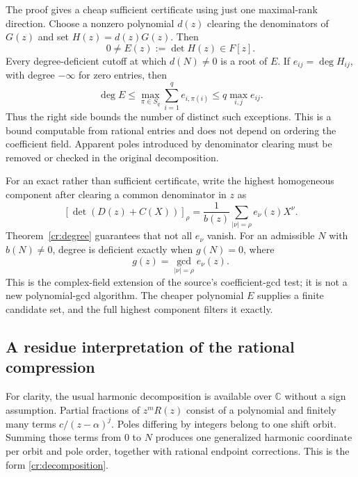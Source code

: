 \documentclass[11pt,a4paper]{article}
\theoremstyle{definition}
\theoremstyle{remark}
\numberwithin{equation}{section}
\begin{document}
The proof gives a cheap sufficient certificate using just one
maximal-rank direction.  Choose a nonzero polynomial $d(z)$ clearing
the denominators of $G(z)$ and set $H(z)=d(z)G(z)$.  Then
\begin{equation}\label{cr:certificate}
 0\ne E(z):=\det H(z)\in F[z].
\end{equation}
Every degree-deficient cutoff at which $d(N)\ne0$ is a root of
$E$.  If $e_{ij}=\deg H_{ij}$, with degree $-\infty$ for zero
entries, then
\begin{equation}\label{cr:degree-bound}
 \deg E\le \max_{\pi\in S_q}\sum_{i=1}^q e_{i,\pi(i)}
 \le q\max_{i,j}e_{ij}.
\end{equation}
Thus the right side bounds the number of distinct such exceptions.
This is a bound computable from rational entries and does not depend
on ordering the coefficient field.  Apparent poles introduced by
denominator clearing must be removed or checked in the original
decomposition.

For an exact rather than sufficient certificate, write the highest
homogeneous component after clearing a common denominator in $z$ as
\[
 [\det(D(z)+C(X))]_\rho
       =\frac{1}{b(z)}\sum_{|\nu|=\rho}e_\nu(z)X^\nu.
\]
Theorem~\ref{cr:degree} guarantees that not all $e_\nu$ vanish.
For an admissible $N$ with $b(N)\ne0$, degree is deficient exactly
when $g(N)=0$, where
\begin{equation}\label{cr:gcd}
 g(z)=\gcd_{|\nu|=\rho}e_\nu(z).
\end{equation}
This is the complex-field extension
of the source's coefficient-gcd test; it is not a new polynomial-gcd
algorithm.  The cheaper polynomial $E$ supplies a finite candidate
set, and the full highest component filters it exactly.

\subsection{A residue interpretation of the rational compression}

For clarity, the usual harmonic decomposition is available over
$\mathbb C$ without a sign assumption.  Partial fractions of
$z^mR(z)$ consist of a polynomial and finitely many terms
$c/(z-\alpha)^j$.  Poles differing by integers belong to one shift
orbit.  Summing those terms from $0$ to $N$ produces one generalized
harmonic coordinate per orbit and pole order, together with rational
endpoint corrections.  This is the form \eqref{cr:decomposition}.
\end{document}
